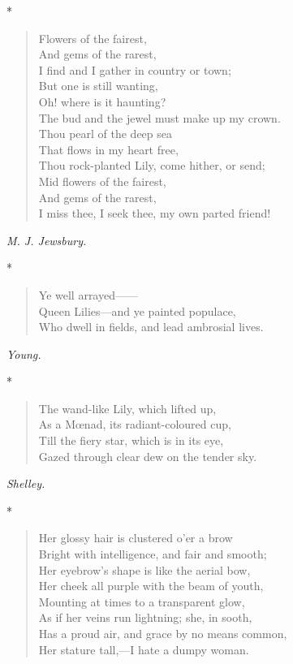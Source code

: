 \documentclass[11pt,twoside]{article}
\newcommand\stars{\begin{center}*\quad*\quad*\end{center}}
\newcommand\by[1]{\par\hfill\textit{#1}\par}
\begin{document}
\stars

\begin{verse}
\quad Flowers of the fairest,\\
\quad And gems of the rarest,\\
I find and I gather in country or town;\\
\quad But one is still wanting,\\
\quad Oh! where is it haunting?\\
The bud and the jewel must make up my crown.\\
\quad Thou pearl of the deep sea\\
\quad That flows in my heart free,\\
Thou rock-planted Lily, come hither, or send;\\
\quad Mid flowers of the fairest,\\
\quad And gems of the rarest,\\
I miss thee, I seek thee, my own parted friend!
\end{verse}

\by{M. J. Jewsbury.}

\stars

\begin{verse}
Ye well arrayed------\\
Queen Lilies---and ye painted populace,\\
Who dwell in fields, and lead ambrosial lives.
\end{verse}

\by{Young.}

\stars

\begin{verse}
The wand-like Lily, which lifted up,\\
As a Mœnad, its radiant-coloured cup,\\
Till the fiery star, which is in its eye,\\
Gazed through clear dew on the tender sky.
\end{verse}

\by{Shelley.}

\stars

\begin{verse}
Her glossy hair is clustered o’er a brow\\
\quad Bright with intelligence, and fair and smooth;\\
Her eyebrow’s shape is like the aerial bow,\\
\quad Her cheek all purple with the beam of youth,\\
Mounting at times to a transparent glow,\\
\quad As if her veins run lightning; she, in sooth,\\
Has a proud air, and grace by no means common,\\
Her stature tall,---I hate a dumpy woman.
\end{verse}
\end{document}
